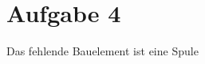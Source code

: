 \documentclass{article}
\begin{document}
\section{Aufgabe 4}
Das fehlende Bauelement ist eine Spule\\
\end{document}
